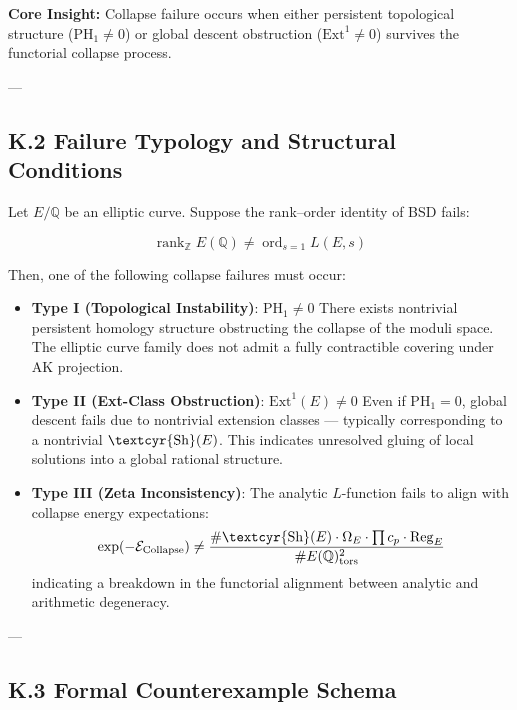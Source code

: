 \documentclass[11pt]{article}
\newcommand{\Sha}{\text{\textcyr{Sh}}}
\begin{document}
\begin{center}
\textbf{Core Insight:} Collapse failure occurs when either persistent topological structure ($\mathrm{PH}_1 \neq 0$) or global descent obstruction ($\mathrm{Ext}^1 \neq 0$) survives the functorial collapse process.
\end{center}

---

\subsection*{K.2 Failure Typology and Structural Conditions}

Let $E/\mathbb{Q}$ be an elliptic curve. Suppose the rank–order identity of BSD fails:

\[
\operatorname{rank}_{\mathbb{Z}} E(\mathbb{Q}) \neq \operatorname{ord}_{s=1} L(E,s)
\]

Then, one of the following collapse failures must occur:

\begin{itemize}
  \item \textbf{Type I (Topological Instability)}: $\mathrm{PH}_1 \neq 0$  
  There exists nontrivial persistent homology structure obstructing the collapse of the moduli space. The elliptic curve family does not admit a fully contractible covering under AK projection.

  \item \textbf{Type II (Ext-Class Obstruction)}: $\mathrm{Ext}^1(E) \neq 0$  
  Even if $\mathrm{PH}_1 = 0$, global descent fails due to nontrivial extension classes — typically corresponding to a nontrivial $\Sha(E)$. This indicates unresolved gluing of local solutions into a global rational structure.

  \item \textbf{Type III (Zeta Inconsistency)}:  
  The analytic $L$-function fails to align with collapse energy expectations:
  \[
  \exp(-\mathcal{E}_{\text{Collapse}}) \neq \frac{\#\Sha(E)\cdot \Omega_E \cdot \prod c_p \cdot \operatorname{Reg}_E}{\# E(\mathbb{Q})_\text{tors}^2}
  \]
  indicating a breakdown in the functorial alignment between analytic and arithmetic degeneracy.
\end{itemize}

---

\subsection*{K.3 Formal Counterexample Schema}
\end{document}
